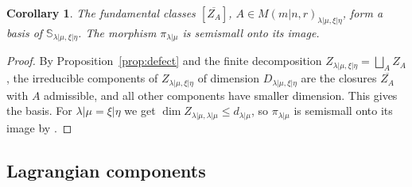 \documentclass[11pt,a4paper]{amsart}
\newtheorem{corollary}[theorem]{Corollary}
\theoremstyle{definition}
\theoremstyle{remark}
\newcommand{\bS}{\mathbb S}
\newcommand{\lm}{\lambda|\mu}
\newcommand{\xh}{\xi|\eta}
\newcommand{\Smat}{M(m|n,r)}
\numberwithin{equation}{section}
\begin{document}
\begin{corollary}\label{cor:BM-basis}
The fundamental classes $[\overline{Z_A}]$, $A\in\Smat_{\lm,\xh}$, form a
basis of $\bS_{\lm,\xh}$. The morphism $\pi_{\lm}$ is semismall onto its
image.
\end{corollary}
\begin{proof}
By Proposition~\ref{prop:defect} and the finite decomposition
$Z_{\lm,\xh}=\bigsqcup_AZ_A$, the irreducible components of $Z_{\lm,\xh}$
of dimension $D_{\lm,\xh}$ are the closures $\overline{Z_A}$ with $A$
admissible, and all other components have smaller dimension. This gives
the basis. For $\lm=\xh$ we get $\dim Z_{\lm,\lm}\le d_{\lm}$, so
$\pi_{\lm}$ is semismall onto its image by
\cite[Remark~2.1.2, p.~154]{dCM04}.
\end{proof}

\subsection{Lagrangian components}
\label{sec:lagrangian}
\end{document}
